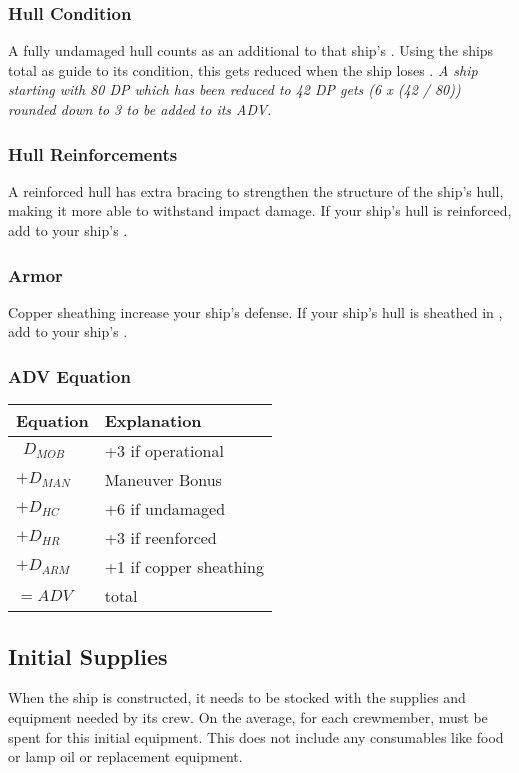 \begin{multicols*}{2}
\subsubsection{Hull Condition}
A fully undamaged hull counts as an additional  to that ship's \ADV. Using the ships \DP total as guide to its condition, this gets reduced when the ship loses \DP. \textit{A ship starting with 80 DP which has been reduced to 42 DP gets (6 x (42 / 80)) rounded down to 3 to be added to its ADV.}
\subsubsection{Hull Reinforcements}
A reinforced hull has extra bracing to strengthen the structure of the ship's hull, making it more able to withstand impact damage. If your ship's hull is reinforced, add  to your ship's \ADV.
\subsubsection{Armor}
Copper sheathing increase your ship's defense. If your ship's hull is sheathed in , add  to your ship's \ADV.
\subsubsection{ADV Equation}

\begin{normboxc}
\label{armor defense value!equation}
\small 
\begin{tabular}{@{} l l}
\textbf{Equation} & \textbf{Explanation}\\ 
\midrule
$\ \ D_{MOB}$ & +3 if operational\\
$+D_{MAN}$ & Maneuver Bonus\\
$+D_{HC}$ & +6 if undamaged\\
$+D_{HR}$ & +3 if reenforced\\
$+D_{ARM}$ & +1 if copper sheathing\\
$=ADV$ & total
\end{tabular}
\end{normboxc}

\subsection{Initial Supplies}
When the ship is constructed, it needs to be stocked with the supplies and equipment needed by its crew. On the average, for each crewmember, \tcdefine{200 sp} must be spent for this initial equipment. This does not include any consumables like food or lamp oil or replacement equipment.

\end{multicols*}
